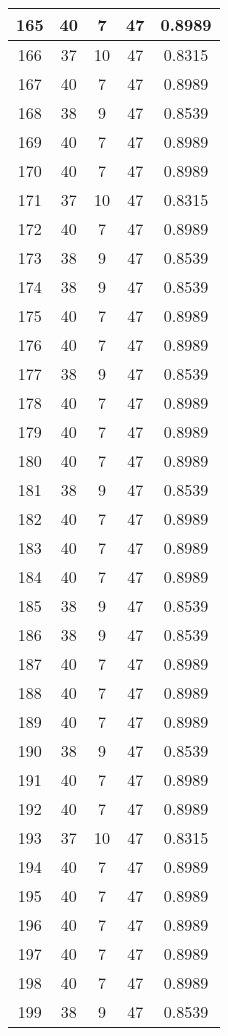 \documentclass[letterpaper, 12pt]{article}
\begin{document}
\begin{longtable}{|c|c|c|c|c|}
\hline
165 & 40 & 7 & 47 & 0.8989 \\
\hline
166 & 37 & 10 & 47 & 0.8315 \\
\hline
167 & 40 & 7 & 47 & 0.8989 \\
\hline
168 & 38 & 9 & 47 & 0.8539 \\
\hline
169 & 40 & 7 & 47 & 0.8989 \\
\hline
170 & 40 & 7 & 47 & 0.8989 \\
\hline
171 & 37 & 10 & 47 & 0.8315 \\
\hline
172 & 40 & 7 & 47 & 0.8989 \\
\hline
173 & 38 & 9 & 47 & 0.8539 \\
\hline
174 & 38 & 9 & 47 & 0.8539 \\
\hline
175 & 40 & 7 & 47 & 0.8989 \\
\hline
176 & 40 & 7 & 47 & 0.8989 \\
\hline
177 & 38 & 9 & 47 & 0.8539 \\
\hline
178 & 40 & 7 & 47 & 0.8989 \\
\hline
179 & 40 & 7 & 47 & 0.8989 \\
\hline
180 & 40 & 7 & 47 & 0.8989 \\
\hline
181 & 38 & 9 & 47 & 0.8539 \\
\hline
182 & 40 & 7 & 47 & 0.8989 \\
\hline
183 & 40 & 7 & 47 & 0.8989 \\
\hline
184 & 40 & 7 & 47 & 0.8989 \\
\hline
185 & 38 & 9 & 47 & 0.8539 \\
\hline
186 & 38 & 9 & 47 & 0.8539 \\
\hline
187 & 40 & 7 & 47 & 0.8989 \\
\hline
188 & 40 & 7 & 47 & 0.8989 \\
\hline
189 & 40 & 7 & 47 & 0.8989 \\
\hline
190 & 38 & 9 & 47 & 0.8539 \\
\hline
191 & 40 & 7 & 47 & 0.8989 \\
\hline
192 & 40 & 7 & 47 & 0.8989 \\
\hline
193 & 37 & 10 & 47 & 0.8315 \\
\hline
194 & 40 & 7 & 47 & 0.8989 \\
\hline
195 & 40 & 7 & 47 & 0.8989 \\
\hline
196 & 40 & 7 & 47 & 0.8989 \\
\hline
197 & 40 & 7 & 47 & 0.8989 \\
\hline
198 & 40 & 7 & 47 & 0.8989 \\
\hline
199 & 38 & 9 & 47 & 0.8539 \\
\hline
\end{longtable}
\end{document}
